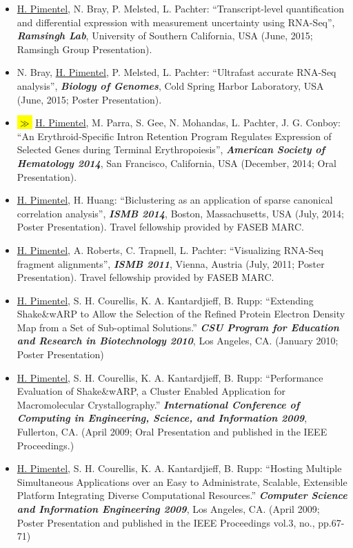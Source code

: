 \documentclass[11pt,notitlepage]{article} %
\newcommand{\hlc}[2][blue]{ {\sethlcolor{#1} \hl{#2}} }
\newcommand{\hlpub}{\hlc[Dandelion]{{\color{white}$\gg$} }}
\begin{document}
\begin{itemize}
\item \underline{H. Pimentel}, N. Bray, P. Melsted, L. Pachter: ``Transcript-level
quantification and differential expression with measurement uncertainty using
RNA-Seq'', {\bf \emph{Ramsingh Lab}}, University of Southern California, USA (June,
2015; Ramsingh Group Presentation).

\item N. Bray, \underline{H. Pimentel}, P. Melsted, L. Pachter: ``Ultrafast accurate
RNA-Seq analysis'', {\bf \emph{Biology of Genomes}}, Cold Spring Harbor
Laboratory, USA (June, 2015; Poster Presentation).

\item \hlpub \underline{H. Pimentel}, M. Parra, S. Gee, N. Mohandas, L. Pachter, J. G.
Conboy: ``An Erythroid-Specific Intron Retention Program Regulates Expression
of Selected Genes during Terminal Erythropoiesis'', {\bf \emph{American Society
    of Hematology 2014}}, San Francisco, California, USA (December, 2014; Oral
Presentation).

\item \underline{H. Pimentel}, H. Huang: ``Biclustering as an application of sparse
canonical correlation analysis'', {\bf \emph{ISMB 2014}}, Boston, Massachusetts,
USA (July, 2014; Poster Presentation). Travel fellowship provided by FASEB
MARC.

\item \underline{H. Pimentel}, A. Roberts, C. Trapnell, L. Pachter: ``Visualizing
RNA-Seq fragment alignments'', {\bf \emph{ISMB 2011}}, Vienna, Austria (July,
2011; Poster Presentation). Travel fellowship provided by FASEB MARC.

\item \underline{H. Pimentel}, S. H. Courellis, K. A. Kantardjieff, B. Rupp:
``Extending Shake\&wARP to Allow the Selection of the Refined Protein Electron
Density Map from a Set of Sub-optimal Solutions.'' {\bf \emph{CSU Program for
    Education and Research in Biotechnology 2010}}, Los Angeles, CA. (January
2010; Poster Presentation)

\item \underline{H. Pimentel}, S. H. Courellis, K. A. Kantardjieff, B. Rupp:
``Performance Evaluation of Shake\&wARP, a Cluster Enabled Application for
Macromolecular Crystallography.'' {\bf \emph{International Conference of
    Computing in Engineering, Science, and Information
    2009}}, Fullerton, CA. (April 2009; Oral Presentation and published in the
         IEEE Proceedings.)

       \item \underline{H. Pimentel}, S. H. Courellis, K. A. Kantardjieff, B. Rupp:
``Hosting Multiple Simultaneous Applications over an Easy to
Administrate, Scalable, Extensible Platform Integrating Diverse
Computational Resources.'' {\bf \emph{Computer Science and Information
    Engineering 2009}}, Los Angeles,
CA. (April 2009; Poster Presentation and published in the
IEEE Proceedings vol.3, no., pp.67-71)


\end{itemize}
\end{document}
